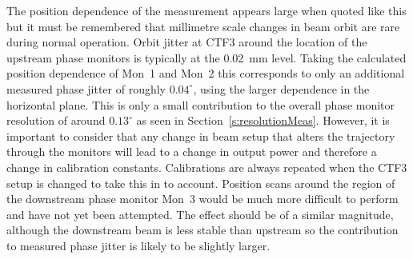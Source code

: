 The position dependence of the measurement appears large when quoted like this but it must be remembered that millimetre scale changes in beam orbit are rare during normal operation. Orbit jitter at CTF3 around the location of the upstream phase monitors is typically at the 0.02~mm level. Taking the calculated position dependence of Mon~1 and Mon~2 this corresponds to only an additional measured phase jitter of roughly \(0.04^\circ\), using the larger dependence in the horizontal plane. This is only a small contribution to the overall phase monitor resolution of around \(0.13^\circ\) as seen in Section~\ref{s:resolutionMeas}. However, it is important to consider that any change in beam setup that alters the trajectory through the monitors will lead to a change in output power and therefore a change in calibration constants. Calibrations are always repeated when the CTF3 setup is changed to take this in to account. Position scans around the region of the downstream phase monitor Mon~3 would be much more difficult to perform and have not yet been attempted. The effect should be of a similar magnitude, although the downstream beam is less stable than upstream so the contribution to measured phase jitter is likely to be slightly larger. 

